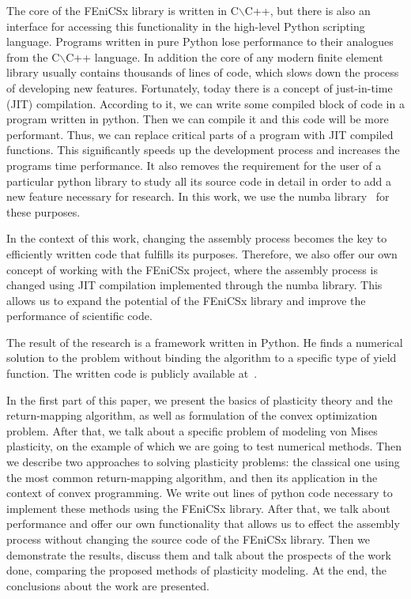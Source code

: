 \documentclass[12pt]{article}
\begin{document}
The core of the FEniCSx library is written in C$\backslash$C++, but there is also an interface for accessing this functionality in the high-level Python scripting language. Programs written in pure Python lose performance to their analogues from the C$\backslash$C++ language. In addition the core of any modern finite element library usually contains thousands of lines of code, which slows down the process of developing new features. Fortunately, today there is a concept of just-in-time (JIT) compilation. According to it, we can write some compiled block of code in a program written in python. Then we can compile it and this code will be more performant. Thus, we can replace critical parts of a program with JIT compiled functions. This significantly speeds up the development process and increases the programs time performance. It also removes the requirement for the user of a particular python library to study all its source code in detail in order to add a new feature necessary for research. In this work, we use the numba library~\parencite{Numba2015} for these purposes. 

In the context of this work, changing the assembly process becomes the key to efficiently written code that fulfills its purposes. Therefore, we also offer our own concept of working with the FEniCSx project, where the assembly process is changed using JIT compilation implemented through the numba library. This allows us to expand the potential of the FEniCSx library and improve the performance of scientific code.

The result of the research is a framework written in Python. He finds a numerical solution to the problem without binding the algorithm to a specific type of yield function. The written code is publicly available at~\parencite{convex-plasticity}. 

In the first part of this paper, we present the basics of plasticity theory and the return-mapping algorithm, as well as formulation of the convex optimization problem. After that, we talk about a specific problem of modeling von Mises plasticity, on the example of which we are going to test numerical methods. Then we describe two approaches to solving plasticity problems: the classical one using the most common return-mapping algorithm, and then its application in the context of convex programming. We write out lines of python code necessary to implement these methods using the FEniCSx library. After that, we talk about performance and offer our own functionality that allows us to effect the assembly process without changing the source code of the FEniCSx library. Then we demonstrate the results, discuss them and talk about the prospects of the work done, comparing the proposed methods of plasticity modeling. At the end, the conclusions about the work are presented.
\end{document}
